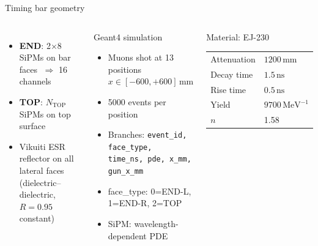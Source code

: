 \documentclass[aspectratio=169,9pt]{beamer}
\newcommand{\Ntop}{N_{\mathrm{TOP}}}
\newcommand{\ns}{\ensuremath{\,\mathrm{ns}}}
\newcommand{\mm}{\ensuremath{\,\mathrm{mm}}}
\begin{document}
\begin{frame}{Timing bar geometry}
\begin{columns}[c]
\vspace{4pt}
\begin{itemize}\setlength\itemsep{2pt}
  \item{\color{cEnd}\textbf{END}}: 2$\times$8 SiPMs on bar faces $\;\Rightarrow$ 16 channels
  \item{\color{cTop}\textbf{TOP}}: $\Ntop$ SiPMs on top surface
  \item Vikuiti ESR reflector on all lateral faces\\
    (dielectric–dielectric, $R=0.95$ constant)
\end{itemize}
\begin{block}{Geant4 simulation}
\begin{itemize}\setlength\itemsep{2pt}
  \item Muons shot at 13 positions $x \in [-600,+600]\mm$
  \item 5000 events per position
  \item Branches: \texttt{event\_id, face\_type,}\\
        \texttt{time\_ns, pde, x\_mm, gun\_x\_mm}
  \item face\_type: 0=END-L, 1=END-R, 2=TOP
  \item SiPM: wavelength-dependent PDE
\end{itemize}
\end{block}

\begin{alertblock}{Material: EJ-230}
\footnotesize\centering
\begin{tabular}{ll}
Attenuation & $1200\mm$ \\
Decay time  & $1.5\ns$ \\
Rise time   & $0.5\ns$ \\
Yield & $9700\,\mathrm{MeV}^{-1}$ \\
$n$ & 1.58 \\
\end{tabular}
\end{alertblock}
\end{columns}
\end{frame}
\end{document}

